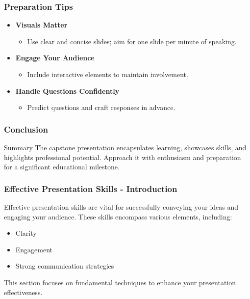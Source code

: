 \documentclass[aspectratio=169]{beamer}
\begin{document}
\begin{frame}[fragile]
    \frametitle{Preparation Tips}
    \begin{itemize}
        \item \textbf{Visuals Matter}
            \begin{itemize}
                \item Use clear and concise slides; aim for one slide per minute of speaking.
            \end{itemize}
        \item \textbf{Engage Your Audience}
            \begin{itemize}
                \item Include interactive elements to maintain involvement.
            \end{itemize}
        \item \textbf{Handle Questions Confidently}
            \begin{itemize}
                \item Predict questions and craft responses in advance.
            \end{itemize}
    \end{itemize}
\end{frame}

\begin{frame}[fragile]
    \frametitle{Conclusion}
    \begin{block}{Summary}
        The capstone presentation encapsulates learning, showcases skills, and highlights professional potential. Approach it with enthusiasm and preparation for a significant educational milestone.
    \end{block}
\end{frame}

\begin{frame}[fragile]
    \frametitle{Effective Presentation Skills - Introduction}
    Effective presentation skills are vital for successfully conveying your ideas and engaging your audience. 
    These skills encompass various elements, including:
    \begin{itemize}
        \item Clarity
        \item Engagement
        \item Strong communication strategies
    \end{itemize}
    This section focuses on fundamental techniques to enhance your presentation effectiveness.
\end{frame}
\end{document}
